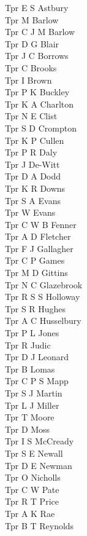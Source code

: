 \begin{multicols}{2}
  Tpr E S Astbury \\
  Tpr M Barlow \\
  Tpr C J M Barlow \\
  Tpr D G Blair \\
  Tpr J C Borrows \\
  Tpr C Brooks \\
  Tpr I Brown \\
  Tpr P K Buckley \\
  Tpr K A Charlton \\
  Tpr N E Clist \\
  Tpr S D Crompton \\
  Tpr K P Cullen \\
  Tpr P R Daly \\
  Tpr J De-Witt \\
  Tpr D A Dodd \\
  Tpr K R Downs \\
  Tpr S A Evans \\
  Tpr W Evans \\
  Tpr C W B Fenner \\
  Tpr A D Fletcher \\
  Tpr F J Gallagher \\
  Tpr C P Games \\
  Tpr M D Gittins \\
  Tpr N C Glazebrook \\
  Tpr R S S Holloway \\
  Tpr S R Hughes \\
  Tpr A C Husselbury \\
  Tpr P L Jones \\
  Tpr R Judic \\
  Tpr D J Leonard \\
  Tpr B Lomas \\
  Tpr C P S Mapp \\
  Tpr S J Martin \\
  Tpr L J Miller \\
  Tpr T Moore \\
  Tpr D Moss \\
  Tpr I S McCready \\
  Tpr S E Newall \\
  Tpr D E Newman \\
  Tpr O Nicholls \\
  Tpr C W Pate \\
  Tpr R T Price \\
  Tpr A K Rae \\
  Tpr B T Reynolds \\

\end{multicols}
